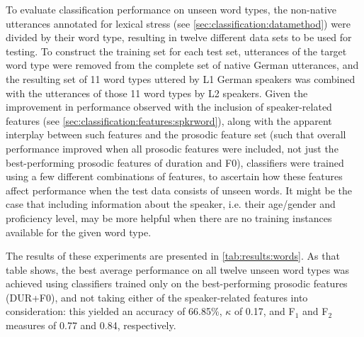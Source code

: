 	
	To evaluate classification performance on unseen word types, the non-native utterances annotated for lexical stress (see \cref{sec:classification:datamethod}) were divided by their word type, resulting in twelve different data sets to be used for testing. To construct the training set for each test set, utterances of the target word type  were removed from the complete set of native German utterances, and the resulting set of 11 word types uttered by L1 German speakers was combined with the utterances of those 11 word types by L2 speakers. Given the improvement in performance observed with the inclusion of speaker-related features (see \cref{sec:classification:features:spkrword}), along with the apparent interplay between such features and the prosodic feature set (such that overall performance improved when all prosodic features were included, not just the best-performing prosodic features of duration and F0), classifiers were trained using a few  different combinations of features, to ascertain how these features affect performance when the test data consists of unseen words. It might be the case that including information about the speaker, i.e. their age/gender and proficiency level, may be more helpful when there are no training instances available for the given word type. 
	
	The results of these experiments are presented in \cref{tab:results:words}. As that table shows, the best average performance on all twelve unseen word types was achieved using classifiers trained only on the best-performing prosodic features (DUR+F0), and not taking either of the speaker-related features into consideration: this yielded an accuracy of 66.85\%, $\kappa$ of 0.17, and F$_1$ and F$_2$ measures of 0.77 and 0.84, respectively. 
	
